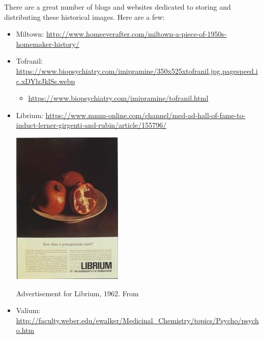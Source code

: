 \begin{refsection}
There are a great number of blogs and websites dedicated to storing and distributing these historical images. Here are a few:

\begin{itemize}
\item Miltown: \url{http://www.homeeverafter.com/miltown-a-piece-of-1950s-homemaker-history/}

\item Tofranil: \url{https://www.biopsychiatry.com/imipramine/350x525xtofranil.jpg.pagespeed.ic.xDYlzJklSs.webp}

\begin{itemize}
\item \url{https://www.biopsychiatry.com/imipramine/tofranil.html}

\end{itemize}

\item Librium: \url{https://www.mmm-online.com/channel/med-ad-hall-of-fame-to-induct-lerner-girgenti-and-rubin/article/155796/}\begin{marginfigure}
 \begin{center}


 \includegraphics{../images/librium_75651.jpg}
\end{center}
 \caption{Advertisement for Librium, 1962. From 
}
\label{fig: valium65}
\end{marginfigure} 

\item Valium: \url{http://faculty.weber.edu/ewalker/Medicinal_Chemistry/topics/Psycho/psycho.htm}
\begin{marginfigure}
 \begin{center}



\end{center}
\end{marginfigure}
\end{itemize}
\end{refsection}
